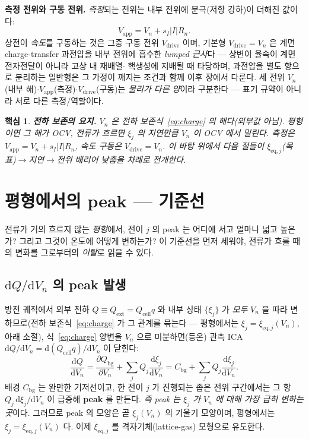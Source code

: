 \documentclass[11pt,a4paper]{article}
\newtheorem*{keybox}{핵심}
\newcommand{\dd}{\mathrm{d}}
\newcommand{\eq}{\mathrm{eq}}
\newcommand{\app}{\mathrm{app}}
\newcommand{\drive}{\mathrm{drive}}
\newcommand{\cell}{\mathrm{cell}}
\newcommand{\bg}{\mathrm{bg}}
\newcommand{\ext}{\mathrm{ext}}
\begin{document}
\textbf{측정 전위와 구동 전위.} \emph{측정}되는 전위는 내부 전위에 분극(저항 강하)이 더해진 값이다:
\begin{equation}
V_\app=V_n+s_I|I|R_n.
\label{eq:vapp}
\end{equation}
상전이 \emph{속도}를 구동하는 것은 그중 구동 전위 $V_\drive$ 이며, 기본형 $V_\drive=V_n$ 은 계면 charge-transfer
과전압을 내부 전위에 흡수한 \emph{lumped 근사}다 — 상변이 율속이 계면 전자전달이 아니라 고상 내 재배열$\cdot$
핵생성에 지배될 때 타당하며, 과전압을 별도 항으로 분리하는 일반형은 그 가정이 깨지는 조건과 함께 이후 장에서
다룬다. 세 전위 $V_n$(내부 해)$\cdot V_\app$(측정)$\cdot V_\drive$(구동)는
\emph{물리가 다른 양}이라 구분한다 — 표기 규약이 아니라 서로 다른 측정/역할이다.

\begin{keybox}
\textbf{전하 보존의 요지.} $V_n$ 은 전하 보존식~\eqref{eq:charge} 의 해다(외부값 아님). 평형이면 그 해가 OCV,
전류가 흐르면 $\xi_j$ 의 지연만큼 $V_n$ 이 OCV 에서 밀린다. 측정은 $V_\app=V_n+s_I|I|R_n$, 속도 구동은
$V_\drive=V_n$. 이 바탕 위에서 다음 절들이 $\xi_{\eq,j}$(목표)$\to$지연$\to$전위 배리어 낮춤을 차례로 전개한다.
\end{keybox}

\section{평형에서의 peak — 기준선}\label{sec:eqpeak}
전류가 거의 흐르지 않는 \emph{평형}에서, 전이 $j$ 의 peak 는 어디에 서고 얼마나 넓고 높은가? 그리고
그것이 온도에 어떻게 변하는가? 이 기준선을 먼저 세워야, 전류가 흐를 때의 변화를 그로부터의 \emph{이탈}로 읽을
수 있다.

\subsection{$\dd Q/\dd V_n$ 의 peak 발생}
방전 궤적에서 외부 전하 $Q\equiv Q_\ext=Q_\cell q$ 와 내부 상태 $\{\xi_j\}$ 가 \emph{모두} $V_n$ 을 따라 변하므로(전하
보존식~\eqref{eq:charge} 가 그 관계를 묶는다 — 평형에서는 $\xi_j=\xi_{\eq,j}(V_n)$, 아래 소절), 식~\eqref{eq:charge}
양변을 $V_n$ 으로 미분하면(등온) 관측 ICA $\dd Q/\dd V_n=\dd(Q_\cell q)/\dd V_n$ 이 닫힌다:
\begin{equation}
\frac{\dd Q}{\dd V_n}=\frac{\partial Q_\bg}{\partial V_n}+\sum_j Q_j\frac{\dd\xi_j}{\dd V_n}
=C_\bg+\sum_j Q_j\frac{\dd\xi_j}{\dd V_n}.
\label{eq:dQdV}
\end{equation}
배경 $C_\bg$ 는 완만한 기저선이고, 한 전이 $j$ 가 진행되는 좁은 전위 구간에서는 그 항 $Q_j\,\dd\xi_j/\dd V_n$ 이
급증해 \textbf{peak} 를 만든다. \emph{즉 peak 는 $\xi_j$ 가 $V_n$ 에 대해 가장 급히 변하는 곳}이다. 그러므로
peak 의 모양은 곧 $\xi_j(V_n)$ 의 기울기 모양이며, 평형에서는 $\xi_j=\xi_{\eq,j}(V_n)$ 다. 이제 $\xi_{\eq,j}$ 를
격자기체(lattice-gas) 모형으로 유도한다.
\end{document}
